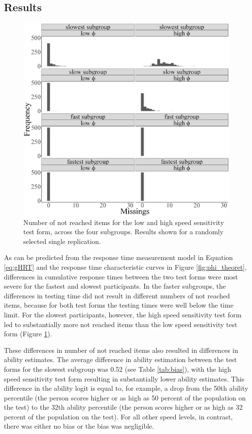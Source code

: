 \documentclass[a4paper,man,apacite,donotrepeattitle]{apa6}
\begin{document}
\subsection{Results}
\begin{figure}	[!htb]	
	\begin{center}
		\includegraphics[height = 0.4\textheight]{miss_subGroup.eps}
	\end{center}
		\caption{Number of not reached items for the low and high speed sensitivity test form, across the four subgroups. Results shown for a randomly selected single replication.}	
		\label{fig:miss}
\end{figure}

As can be predicted from the response time measurement model in Equation \ref{eq:gHRT} and the response time characteristic curves in Figure \ref{fig:phi_theoret}, differences in cumulative response times between the two test forms were most severe for the fastest and slowest participants.  In the faster subgroups, the differences in testing time did not result in different numbers of not reached items, because for both test forms the testing times were well below the time limit. For the slowest participants, however, the high speed sensitivity test form led to substantially more not reached items than the low speed sensitivity test form (Figure \ref{fig:miss}). 

These differences in number of not reached items also resulted in differences in ability estimates. The average difference in ability estimation between the test forms for the slowest subgroup was 0.52 (see Table \ref{tab:bias}), with the high speed sensitivity test form resulting in substantially lower ability estimates. This difference in the ability logit is equal to, for example, a drop from the 50th ability percentile (the person scores higher or as high as 50 percent of the population on the test) to the 32th ability percentile (the person scores higher or as high as 32 percent of the population on the test). For all other speed levels, in contrast, there was either no bias or the bias was negligible. 
\end{document}
